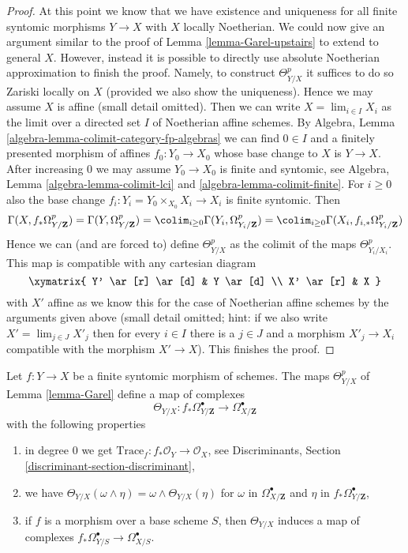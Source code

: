 \begin{proof}
\medskip\noindent
At this point we know that we have existence and uniqueness
for all finite syntomic morphisms $Y \to X$ with $X$ locally Noetherian.
We could now give an argument similar to the proof of
Lemma \ref{lemma-Garel-upstairs} to extend to general $X$.
However, instead it is possible to directly use
absolute Noetherian approximation to finish the proof.
Namely, to construct $\Theta^p_{Y/X}$
it suffices to do so Zariski locally on $X$ (provided we also
show the uniqueness). Hence we may assume $X$ is affine (small
detail omitted). Then we can write $X = \lim_{i \in I} X_i$
as the limit over a directed set $I$ of Noetherian affine schemes.
By Algebra, Lemma \ref{algebra-lemma-colimit-category-fp-algebras}
we can find $0 \in I$ and a finitely
presented morphism of affines $f_0 : Y_0 \to X_0$ whose base change to
$X$ is $Y \to X$. After increasing $0$ we may assume $Y_0 \to X_0$
is finite and syntomic, see
Algebra, Lemma \ref{algebra-lemma-colimit-lci} and
\ref{algebra-lemma-colimit-finite}. For $i \geq 0$ also the
base change $f_i : Y_i = Y_0 \times_{X_0} X_i \to X_i$ is finite syntomic.
Then
$$
\Gamma(X, f_*\Omega^p_{Y/\mathbf{Z}}) =
\Gamma(Y, \Omega^p_{Y/\mathbf{Z}}) =
\colim_{i \geq 0} \Gamma(Y_i, \Omega^p_{Y_i/\mathbf{Z}}) =
\colim_{i \geq 0} \Gamma(X_i, f_{i, *}\Omega^p_{Y_i/\mathbf{Z}})
$$
Hence we can (and are forced to) define $\Theta^p_{Y/X}$ as the colimit
of the maps $\Theta^p_{Y_i/X_i}$. This map is compatible with any
cartesian diagram
$$
\xymatrix{
Y' \ar[r] \ar[d] & Y \ar[d] \\
X' \ar[r] & X
}
$$
with $X'$ affine as we know this for the case of Noetherian affine schemes
by the arguments given above (small detail omitted; hint: if we also
write $X' = \lim_{j \in J} X'_j$ then for every $i \in I$ there is a $j \in J$
and a morphism $X'_j \to X_i$ compatible with the morphism $X' \to X$).
This finishes the proof.
\end{proof}

\begin{proposition}
\label{proposition-Garel}
\begin{reference}
\cite{Garel}
\end{reference}
Let $f : Y \to X$ be a finite syntomic morphism of schemes.
The maps $\Theta^p_{Y/X}$ of Lemma \ref{lemma-Garel} define a map of complexes
$$
\Theta_{Y/X} :
f_*\Omega^\bullet_{Y/\mathbf{Z}}
\longrightarrow
\Omega^\bullet_{X/\mathbf{Z}}
$$
with the following properties
\begin{enumerate}
\item in degree $0$ we get
$\text{Trace}_f : f_*\mathcal{O}_Y \to \mathcal{O}_X$, see
Discriminants, Section \ref{discriminant-section-discriminant},
\item we have
$\Theta_{Y/X}(\omega \wedge \eta) = \omega \wedge \Theta_{Y/X}(\eta)$
for $\omega$ in $\Omega^\bullet_{X/\mathbf{Z}}$ and $\eta$
in $f_*\Omega^\bullet_{Y/\mathbf{Z}}$,
\item if $f$ is a morphism over a base scheme $S$, then
$\Theta_{Y/X}$ induces a map of complexes
$f_*\Omega^\bullet_{Y/S} \to \Omega^\bullet_{X/S}$.
\end{enumerate}
\end{proposition}

